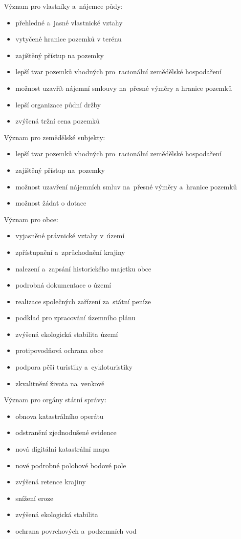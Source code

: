 Význam  pro vlastníky a~nájemce půdy:
	\begin{itemize}[leftmargin=1.5cm]
		\item přehledné a~jasné vlastnické vztahy
		\item vytyčené hranice pozemků v terénu
		\item zajištěný přístup na pozemky
		\item lepší tvar pozemků vhodných pro~racionální zemědělské hospodaření
		\item možnost uzavřít nájemní smlouvy na~přesné výměry a hranice pozemků
		\item lepší organizace půdní držby
		\item zvýšená tržní cena pozemků
	\end{itemize}

Význam  pro zemědělské subjekty:
	\begin{itemize}[leftmargin=1.5cm]
		\item lepší tvar pozemků vhodných pro~racionální zemědělské hospodaření
		\item zajištěný přístup na~pozemky
		\item možnost uzavření nájemních smluv na~přesné výměry a~hranice pozemků
		\item možnost žádat o dotace
	\end{itemize}

Význam  pro obce:
	\begin{itemize}[leftmargin=1.5cm]
		\item vyjasněné právnické vztahy v~území
		\item zpřístupnění a~zprůchodnění krajiny
		\item nalezení a~zapsání historického majetku obce
		\item podrobná dokumentace o území
		\item realizace společných zařízení za~státní peníze
		\item podklad pro zpracování územního plánu
		\item zvýšená ekologická stabilita území
		\item protipovodňová ochrana obce
		\item podpora pěší turistiky a~cykloturistiky
		\item zkvalitnění života na~venkově
	\end{itemize}

Význam  pro orgány státní správy:
	\begin{itemize}[leftmargin=1.5cm]
		\item obnova katastrálního operátu
		\item odstranění zjednodušené evidence
		\item nová digitální katastrální mapa
		\item nové podrobné polohové bodové pole
		\item zvýšená retence krajiny
		\item snížení eroze
		\item zvýšená ekologická stabilita
		\item ochrana povrchových a~podzemních vod
	\end{itemize}

